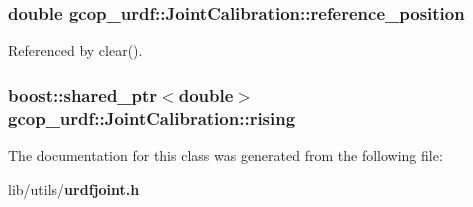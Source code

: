 \subsubsection[{reference\-\_\-position}]{\setlength{\rightskip}{0pt plus 5cm}double {\bf gcop\-\_\-urdf\-::\-Joint\-Calibration\-::reference\-\_\-position}}\label{classgcop__urdf_1_1JointCalibration_ad115735068421493051b5b6f1267c4fe}


\-Referenced by clear().

\subsubsection[{rising}]{\setlength{\rightskip}{0pt plus 5cm}boost\-::shared\-\_\-ptr$<$double$>$ {\bf gcop\-\_\-urdf\-::\-Joint\-Calibration\-::rising}}\label{classgcop__urdf_1_1JointCalibration_aacbd4c2efd504e7f5e789a7a4cfc1bcf}


\-The documentation for this class was generated from the following file\-:\begin{DoxyCompactItemize}
\item 
lib/utils/{\bf urdfjoint.\-h}\end{DoxyCompactItemize}

